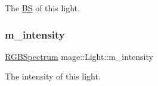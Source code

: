 The \hyperlink{structmage_1_1_b_s}{BS} of this light. \hypertarget{classmage_1_1_light_a4ed8d43c8a4df71671a922d5f04974b8}{}\label{classmage_1_1_light_a4ed8d43c8a4df71671a922d5f04974b8} 
\subsubsection{\texorpdfstring{m\+\_\+intensity}{m\_intensity}}
{\footnotesize\ttfamily \hyperlink{structmage_1_1_r_g_b_spectrum}{R\+G\+B\+Spectrum} mage\+::\+Light\+::m\+\_\+intensity\hspace{0.3cm}{\ttfamily [private]}}

The intensity of this light. 